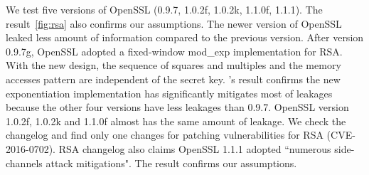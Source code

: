 We test five versions of OpenSSL (0.9.7, 1.0.2f, 1.0.2k, 1.1.0f, 1.1.1). 
The result~\ref{fig:rsa} also confirms 
our assumptions. The newer version of
OpenSSL leaked less amount of information compared to the previous version.
After version 0.9.7g, OpenSSL adopted a fixed-window mod\_exp implementation 
for RSA. With the new design, the sequence of squares and multiples and the 
memory accesses pattern are independent of the secret key. \tool{}'s result
confirms the new exponentiation implementation has significantly mitigates
most of leakages because the other four versions have less leakages than 0.9.7. 
OpenSSL version 1.0.2f, 1.0.2k and 1.1.0f almost has the same amount of leakage. 
We check the changelog and find only one changes for patching vulnerabilities
for RSA (CVE-2016-0702). RSA changelog also claims OpenSSL 1.1.1 adopted
``numerous side-channels attack mitigations". The result confirms our assumptions.
